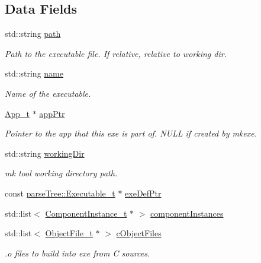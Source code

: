 \subsection*{Data Fields}
\begin{DoxyCompactItemize}
\item 
std\+::string \hyperlink{structmodel_1_1_exe__t_a64ab662ba17fe95f229b11a848ddc0bf}{path}
\begin{DoxyCompactList}\small\item\em Path to the executable file. If relative, relative to working dir. \end{DoxyCompactList}\item 
std\+::string \hyperlink{structmodel_1_1_exe__t_a1296e03bcfe765f9739607b265485955}{name}
\begin{DoxyCompactList}\small\item\em Name of the executable. \end{DoxyCompactList}\item 
\hyperlink{structmodel_1_1_app__t}{App\+\_\+t} $\ast$ \hyperlink{structmodel_1_1_exe__t_a8b465b9d1fcfcfc6d990b3aeacffe8a9}{app\+Ptr}
\begin{DoxyCompactList}\small\item\em Pointer to the app that this exe is part of. N\+U\+LL if created by mkexe. \end{DoxyCompactList}\item 
std\+::string \hyperlink{structmodel_1_1_exe__t_a3356bfd82375ed963020e7239c84d955}{working\+Dir}
\begin{DoxyCompactList}\small\item\em mk tool working directory path. \end{DoxyCompactList}\item 
const \hyperlink{structparse_tree_1_1_executable__t}{parse\+Tree\+::\+Executable\+\_\+t} $\ast$ \hyperlink{structmodel_1_1_exe__t_a8707e5e8ad70296c920168a4998cd146}{exe\+Def\+Ptr}
\item 
std\+::list$<$ \hyperlink{structmodel_1_1_component_instance__t}{Component\+Instance\+\_\+t} $\ast$ $>$ \hyperlink{structmodel_1_1_exe__t_aadd56a419d93a166c962c3b12aef0c19}{component\+Instances}
\item 
std\+::list$<$ \hyperlink{structmodel_1_1_object_file__t}{Object\+File\+\_\+t} $\ast$ $>$ \hyperlink{structmodel_1_1_exe__t_a74b530bfebded4e1d6bcb3a263284642}{c\+Object\+Files}
\begin{DoxyCompactList}\small\item\em .o files to build into exe from C sources. \end{DoxyCompactList}\item 

\end{DoxyCompactItemize}
